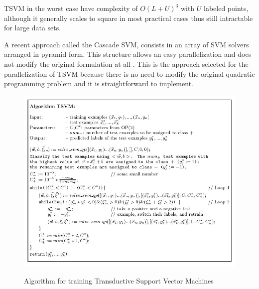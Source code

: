 TSVM in the worst case have complexity of $O(L+U)^{3}$ with $U$
labeled points, although it generally scales to square in most practical
cases \cite{Joachims/99a} thus still intractable for large data sets.

A recent approach called the Cascade SVM, consists in an array of SVM
solvers arranged in pyramid form. This structure allows an easy parallelization
and does not modify the original formulation at all \cite{GrafCBDV04,ZhangZY05}.
This is the approach selected for the parallelization of TSVM because
there is no need to modify the original quadratic programming problem
and it is straightforward to implement. %
%
\begin{figure}[H]
\begin{centering}
\includegraphics[scale=0.3]{images/joachims-algorithm}\label{fig:alg-tsvm}
\par\end{centering}
\caption{Algorithm for training Transductive Support Vector Machines \cite{Joachims99c}}
\end{figure}
